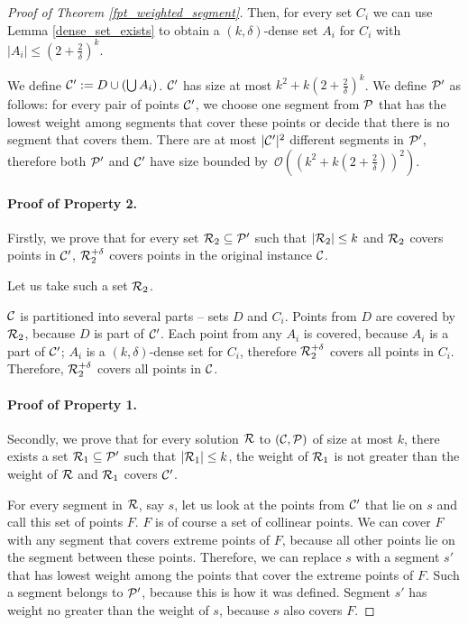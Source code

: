 \begin{proof}[Proof of Theorem \ref{fpt_weighted_segment}]
Then, for every set $C_i$ we can use Lemma \ref{dense_set_exists}
to obtain a $(k,\delta)$-dense set $A_i$
for $C_i$ with $|A_i| \le (2+\frac{2}{\delta})^k$.

We define $\mathcal{C}':= D \cup (\bigcup A_i)$. $\mathcal{C}'$ has size at most
$k^2 + k(2+\frac{2}{\delta})^k$.
We define $\mathcal{P}'$ as follows: for every pair of points $\mathcal{C}'$,
we choose one segment from
$\mathcal{P}$ that has the lowest weight
among segments that cover these points 
or decide that there is no segment that covers them.
There are at most $|\mathcal{C}'|^2$ different segments in $\mathcal{P}'$,
therefore both $\mathcal{P}'$ and $\mathcal{C}'$ have size bounded
by~$\mathcal{O}\left((k^2 + k(2+\frac{2}{\delta}))^2\right)$.

\paragraph{Proof of Property 2.}
Firstly, we prove that
for every set $\mathcal{R}_2 \subseteq \mathcal{P}'$ such that $|\mathcal{R}_2| \le k$
and $\mathcal{R}_2$ covers points in $\mathcal{C}'$, $\mathcal{R}_2^{+\delta}$
covers points in the original instance $\mathcal{C}$.

Let us take such a set $\mathcal{R}_2$.

$\mathcal{C}$ is partitioned into several parts -- sets $D$ and $C_i$.
Points from $D$ are covered by $\mathcal{R}_2$, because $D$ is part of $\mathcal{C}'$.
Each point from any $A_i$ is covered, because $A_i$ is a part of $\mathcal{C}'$;
$A_i$ is a $(k,\delta)$-dense set for $C_i$, therefore $\mathcal{R}_2^{+\delta}$
covers all points in $C_i$. Therefore, $\mathcal{R}_2^{+\delta}$ covers
all points in $\mathcal{C}$.

\paragraph{Proof of Property 1.}
Secondly, we prove that for every solution
$\mathcal{R}$ to $(\mathcal{C},\mathcal{P})$ of size at most $k$,
there exists a set $\mathcal{R}_1 \subseteq \mathcal{P}'$ such that
$|\mathcal{R}_1| \le k$, the weight of $\mathcal{R}_1$ is not greater than
the weight of $\mathcal{R}$ and $\mathcal{R}_1$ covers $\mathcal{C}'$.

For every segment in $\mathcal{R}$, say $s$,
let us look at the points from $\mathcal{C}'$ that lie on $s$
and call this set of points $F$.
$F$ is of course a set of collinear points.
We can cover $F$ with any segment that covers extreme points of $F$,
because all other points lie on the segment between these points.
Therefore, we can replace $s$ with a segment $s'$
that has lowest weight among the points that cover the extreme points of $F$.
Such a segment belongs to $\mathcal{P}'$, because this is how it was defined.
Segment $s'$ has weight no greater than the weight of $s$,
because $s$ also covers $F$.


\end{proof}
